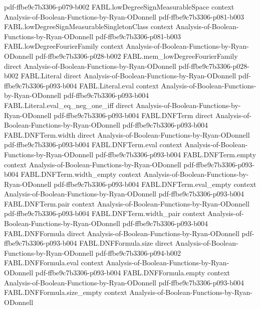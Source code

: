 \begin{theorem}
  {pdf-ffbe9c7b3306-p079-b002}
\proofstep
  {FABL.lowDegreeSignMeasurableSpace}
  {context}
  {Analysis-of-Boolean-Functions-by-Ryan-ODonnell}
  {pdf-ffbe9c7b3306-p081-b003}
\proofstep
  {FABL.lowDegreeSignMeasurableSingletonClass}
  {context}
  {Analysis-of-Boolean-Functions-by-Ryan-ODonnell}
  {pdf-ffbe9c7b3306-p081-b003}
\proofstep
  {FABL.lowDegreeFourierFamily}
  {context}
  {Analysis-of-Boolean-Functions-by-Ryan-ODonnell}
  {pdf-ffbe9c7b3306-p028-b002}
\proofstep
  {FABL.mem_lowDegreeFourierFamily}
  {direct}
  {Analysis-of-Boolean-Functions-by-Ryan-ODonnell}
  {pdf-ffbe9c7b3306-p028-b002}
\proofstep
  {FABL.Literal}
  {direct}
  {Analysis-of-Boolean-Functions-by-Ryan-ODonnell}
  {pdf-ffbe9c7b3306-p093-b004}
\proofstep
  {FABL.Literal.eval}
  {context}
  {Analysis-of-Boolean-Functions-by-Ryan-ODonnell}
  {pdf-ffbe9c7b3306-p093-b004}
\proofstep
  {FABL.Literal.eval_eq_neg_one_iff}
  {direct}
  {Analysis-of-Boolean-Functions-by-Ryan-ODonnell}
  {pdf-ffbe9c7b3306-p093-b004}
\proofstep
  {FABL.DNFTerm}
  {direct}
  {Analysis-of-Boolean-Functions-by-Ryan-ODonnell}
  {pdf-ffbe9c7b3306-p093-b004}
\proofstep
  {FABL.DNFTerm.width}
  {direct}
  {Analysis-of-Boolean-Functions-by-Ryan-ODonnell}
  {pdf-ffbe9c7b3306-p093-b004}
\proofstep
  {FABL.DNFTerm.eval}
  {context}
  {Analysis-of-Boolean-Functions-by-Ryan-ODonnell}
  {pdf-ffbe9c7b3306-p093-b004}
\proofstep
  {FABL.DNFTerm.empty}
  {context}
  {Analysis-of-Boolean-Functions-by-Ryan-ODonnell}
  {pdf-ffbe9c7b3306-p093-b004}
\proofstep
  {FABL.DNFTerm.width_empty}
  {context}
  {Analysis-of-Boolean-Functions-by-Ryan-ODonnell}
  {pdf-ffbe9c7b3306-p093-b004}
\proofstep
  {FABL.DNFTerm.eval_empty}
  {context}
  {Analysis-of-Boolean-Functions-by-Ryan-ODonnell}
  {pdf-ffbe9c7b3306-p093-b004}
\proofstep
  {FABL.DNFTerm.pair}
  {context}
  {Analysis-of-Boolean-Functions-by-Ryan-ODonnell}
  {pdf-ffbe9c7b3306-p093-b004}
\proofstep
  {FABL.DNFTerm.width_pair}
  {context}
  {Analysis-of-Boolean-Functions-by-Ryan-ODonnell}
  {pdf-ffbe9c7b3306-p093-b004}
\proofstep
  {FABL.DNFFormula}
  {direct}
  {Analysis-of-Boolean-Functions-by-Ryan-ODonnell}
  {pdf-ffbe9c7b3306-p093-b004}
\proofstep
  {FABL.DNFFormula.size}
  {direct}
  {Analysis-of-Boolean-Functions-by-Ryan-ODonnell}
  {pdf-ffbe9c7b3306-p094-b002}
\proofstep
  {FABL.DNFFormula.eval}
  {context}
  {Analysis-of-Boolean-Functions-by-Ryan-ODonnell}
  {pdf-ffbe9c7b3306-p093-b004}
\proofstep
  {FABL.DNFFormula.empty}
  {context}
  {Analysis-of-Boolean-Functions-by-Ryan-ODonnell}
  {pdf-ffbe9c7b3306-p093-b004}
\proofstep
  {FABL.DNFFormula.size_empty}
  {context}
  {Analysis-of-Boolean-Functions-by-Ryan-ODonnell}

\end{theorem}
